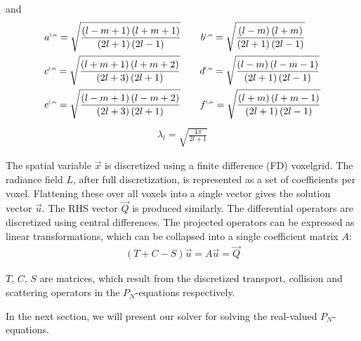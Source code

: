 and
\begin{align*}
&
a^{\scaleto{l,m}{4pt}}= \sqrt{\frac{\left(l-m+1\right)\left(l+m+1\right)}{\left(2l+1\right)\left(2l-1\right)}} \qquad
b^{\scaleto{l,m}{4pt}}= \sqrt{\frac{\left(l-m\right)\left(l+m\right)}{\left(2l+1\right)\left(2l-1\right)}}
\\&
c^{\scaleto{l,m}{4pt}}= \sqrt{\frac{\left(l+m+1\right)\left(l+m+2\right)}{\left(2l+3\right)\left(2l+1\right)}} \qquad
d^{\scaleto{l,m}{4pt}}= \sqrt{\frac{\left(l-m\right)\left(l-m-1\right)}{\left(2l+1\right)\left(2l-1\right)}}
\\&
e^{\scaleto{l,m}{4pt}}= \sqrt{\frac{\left(l-m+1\right)\left(l-m+2\right)}{\left(2l+3\right)\left(2l+1\right)}} \qquad
f^{\scaleto{l,m}{4pt}}= \sqrt{\frac{\left(l+m\right)\left(l+m-1\right)}{\left(2l+1\right)\left(2l-1\right)}}
\end{align*}
\begin{align*}
\lambda_l=\sqrt{\frac{4\pi}{2l+1}}
\end{align*}

\begin{figure}[h]
\centering
{}
\vspace{-0.2in}
\end{figure}

\begin{figure*}[t]
\centering
{}
\vspace{-0.2in}
\label{fig:pnsolver}
\end{figure*}

The spatial variable $\vec{x}$ is discretized using a finite difference (FD) voxelgrid. The radiance field $L$, after full discretization, is represented as a set of coefficients per voxel. Flattening these over all voxels into a single vector gives the solution vector $\vec{u}$. The RHS vector $\vec{Q}$ is produced similarly. The differential operators are discretized using central differences. The projected operators can be expressed as linear transformations, which can be collapsed into a single coefficient matrix $A$:
\begin{align}
(T+C-S)\vec{u} = A\vec{u} = \vec{Q}
\end{align}

$T$, $C$, $S$ are matrices, which result from the discretized transport, collision and scattering operators in the $P_N$-equations respectively.



In the next section, we will present our solver for solving the real-valued $P_N$-equations. 

